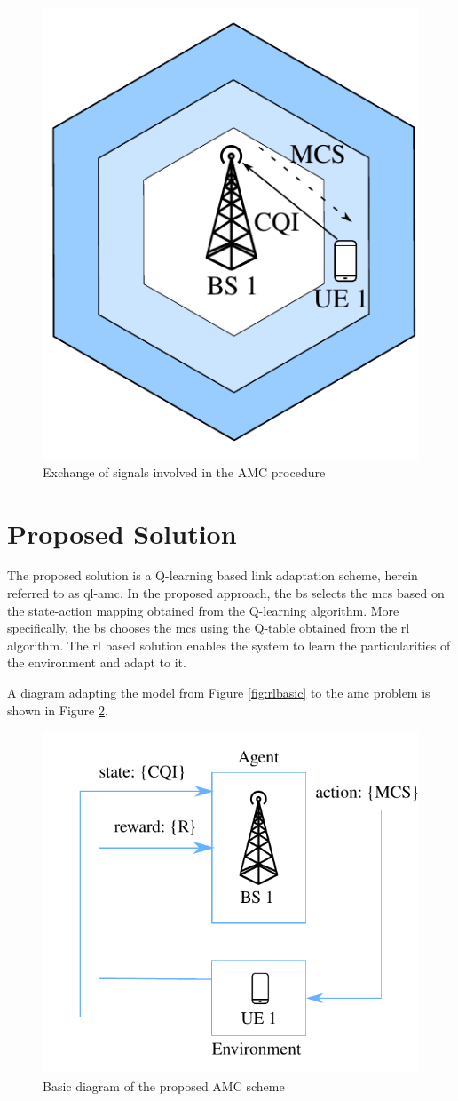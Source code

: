 \begin{figure}[htb]
\centerline{\includegraphics[width=0.4\columnwidth]{figures/chp_amc/system-model-mateus.pdf}}
\caption{Exchange of signals involved in the AMC procedure}
\label{fig:amc-system-model}
\end{figure}






\section{Proposed Solution}

The proposed solution is a Q-learning based link adaptation scheme, herein referred to as \gls{ql-amc}.
%
In the proposed approach, the \gls{bs} selects the \gls{mcs} based on the state-action mapping obtained from the Q-learning algorithm.
%
More specifically, the \gls{bs} chooses the \gls{mcs} using the Q-table obtained from the \gls{rl} algorithm.
%
The \gls{rl} based solution enables the system to learn the particularities of the environment and adapt to it.

A diagram adapting the model from Figure \ref{fig:rlbasic} to the \gls{amc} problem is shown in Figure \ref{fig:amc-rl-frame}.
%
\begin{figure}[htb]
\centerline{\includegraphics[width=0.5\columnwidth]{figures/chp_amc/rl-framework-mateus.pdf}}
\caption{Basic diagram of the proposed AMC scheme}
\label{fig:amc-rl-frame}
\end{figure}
%

